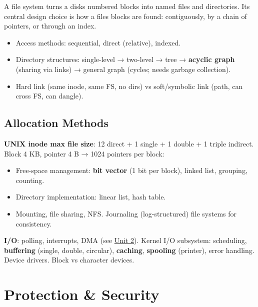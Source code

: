 A file system turns a disk\textquotesingle s numbered blocks into named files and directories. Its central design choice is
how a file\textquotesingle s blocks are found: contiguously, by a chain of pointers, or through an index.

\begin{itemize}
\tightlist
\item
  Access methods: sequential, direct (relative), indexed.
\item
  Directory structures: single-level → two-level → tree → \textbf{acyclic graph} (sharing via links) → general graph (cycles; needs garbage collection).
\item
  Hard link (same inode, same FS, no dirs) vs soft/symbolic link (path, can cross FS, can dangle).
\end{itemize}

\needspace{95pt}

\hypertarget{p2-05--allocation-methods}{%
\subsection{Allocation Methods}\label{p2-05--allocation-methods}}



\textbf{UNIX inode max file size}: 12 direct + 1 single + 1 double + 1 triple indirect. Block 4 KB, pointer 4 B → 1024 pointers per block:



\begin{itemize}
\tightlist
\item
  Free-space management: \textbf{bit vector} (1 bit per block), linked list, grouping, counting.
\item
  Directory implementation: linear list, hash table.
\item
  Mounting, file sharing, NFS. Journaling (log-structured) file systems for consistency.
\end{itemize}

\textbf{I/O}: polling, interrupts, DMA (see \protect\hyperlink{p2-02}{Unit 2}). Kernel I/O subsystem: scheduling, \textbf{buffering} (single, double, circular), \textbf{caching}, \textbf{spooling} (printer), error handling. Device drivers. Block vs character devices.

\needspace{95pt}

\hypertarget{p2-05--10-protection--security}{%
\section{Protection \& Security}\label{p2-05--10-protection--security}}

